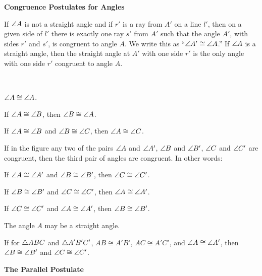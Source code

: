 \documentclass[11pt]{book}
\newcommand{\APPsub}[1]{%
  \par\medskip\begin{center}\bfseries\small #1\end{center}\par\nopagebreak}
\begin{document}
\APPsub{Congruence Postulates for Angles}

\begin{applist}[resume]
\item If $\angle A$ is not a straight angle and if $r'$ is a ray from $A'$ on
      a line $l'$, then on a given side of $l'$ there is exactly one ray
      $s'$ from $A'$ such that the angle $A'$, with sides $r'$ and $s'$, is
      congruent to angle $A$. We write this as ``$\angle A' \cong \angle A$.''
      If $\angle A$ is a straight angle, then the straight angle at $A'$ with
      one side $r'$ is the only angle with one side $r'$ congruent to angle
      $A$.
\item ~
      \begin{applist}
      \item $\angle A \cong \angle A$.
      \item If $\angle A \cong \angle B$, then $\angle B \cong \angle A$.
      \item If $\angle A \cong \angle B$ and $\angle B \cong \angle C$, then
            $\angle A \cong \angle C$.
      \end{applist}
\item If in the figure any two of the pairs $\angle A$ and $\angle A'$,
      $\angle B$ and $\angle B'$, $\angle C$ and $\angle C'$ are congruent, then
      the third pair of angles are congruent. In other words:
      \begin{applist}
      \item If $\angle A \cong \angle A'$ and $\angle B \cong \angle B'$, then
            $\angle C \cong \angle C'$.
      \item If $\angle B \cong \angle B'$ and $\angle C \cong \angle C'$, then
            $\angle A \cong \angle A'$.
      \item If $\angle C \cong \angle C'$ and $\angle A \cong \angle A'$, then
            $\angle B \cong \angle B'$.
      \end{applist}
      The angle $A$ may be a straight angle.
\end{applist}

\FIGAPPONE

\begin{applist}[resume]
\item If for $\triangle ABC$ and $\triangle A'B'C'$, $AB \cong A'B'$,
      $AC \cong A'C'$, and $\angle A \cong \angle A'$, then
      $\angle B \cong \angle B'$ and $\angle C \cong \angle C'$.
\end{applist}

\APPsub{The Parallel Postulate}
\end{document}
